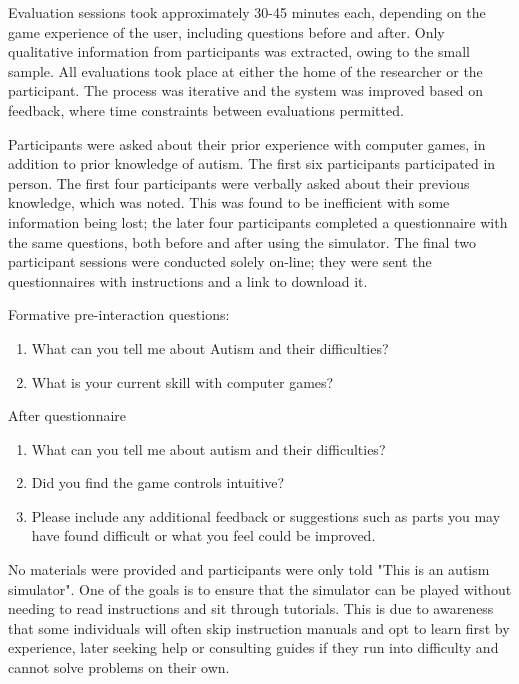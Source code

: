\documentclass[11pt]{report}
\begin{document}
Evaluation sessions took approximately 30-45 minutes each, depending on the game experience of the user, including questions before and after. Only qualitative information from participants was extracted, owing to the small sample. All evaluations took place at either the home of the researcher or the participant. The process was iterative and the system was improved based on feedback, where time constraints between evaluations permitted.

Participants were asked about their prior experience with computer games, in addition to prior knowledge of autism. The first six participants participated in person. The first four participants were verbally asked about their previous knowledge, which was noted. This was found to be inefficient with some information being lost; the later four participants completed a questionnaire with the same questions, both before and after using the simulator. The final two participant sessions were conducted solely on-line; they were sent the questionnaires with instructions and a link to download it. 

Formative pre-interaction questions:
\begin{enumerate}
\item What can you tell me about Autism and their difficulties?
\item What is your current skill with computer games?
\end{enumerate}

After questionnaire 
\begin{enumerate}
\item What can you tell me about autism and their difficulties?
\item Did you find the game controls intuitive?
\item Please include any additional feedback or suggestions such as parts you may have found difficult or what you feel could be improved.
\end{enumerate}

No materials were provided and participants were only told "This is an autism simulator". One of the goals is to ensure that the simulator can be played without needing to read instructions and sit through tutorials. This is due to awareness that some individuals will often skip instruction manuals and opt to learn first by experience, later seeking help or consulting guides if they run into difficulty and cannot solve problems on their own.
\end{document}
